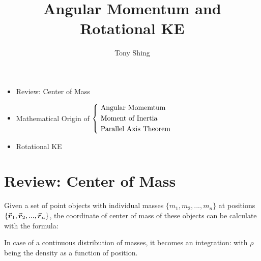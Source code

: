 \documentclass[class=article, crop=false, 12pt]{standalone}
\author{Tony Shing}
\title{Angular Momentum and Rotational KE}
\begin{document}
\maketitle


\begin{overview}
    \begin{itemize}
        \item Review: Center of Mass
        \item Mathematical Origin of 
        $\left\{ \ \begin{aligned} 
            &\text{Angular Momemtum} \\ 
            &\text{Moment of Inertia} \\ 
            &\text{Parallel Axis Theorem}
         \end{aligned}\right.$
        \item Rotational KE
    \end{itemize}
\end{overview}



\section{Review: Center of Mass}

Given a set of point objects with individual masses $\{m_1, m_2, ..., m_n\}$ at positions $\{\va*{r}_1, \va*{r}_2, ..., \va*{r}_n\}$,
the coordinate of center of mass of these objects can be calculate with the formula:

In case of a continuous distribution of masses, it becomes an integration:
with $\rho$ being the density as a function of position.
\end{document}
